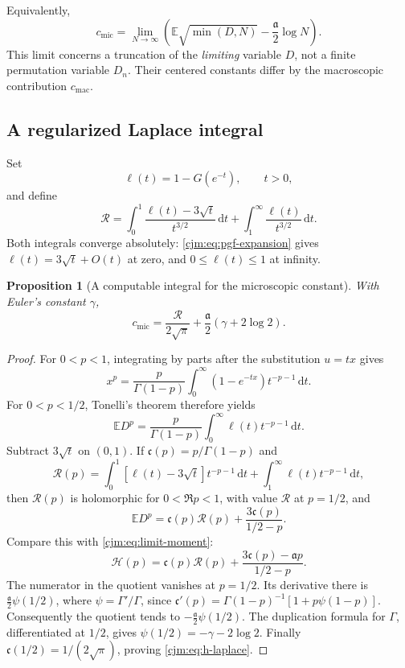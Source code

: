 \documentclass[11pt,a4paper]{article}
\newtheorem{proposition}[proposition]{Proposition}
\theoremstyle{definition}\newaliascnt{definition}{theorem}
\theoremstyle{remark}\newaliascnt{remark}{theorem}
\newcommand{\dd}{\mathrm d}
\newcommand{\ljE}{\mathbb E}
\newcommand{\cjmic}{c_{\mathrm{mic}}}
\newcommand{\cjmac}{c_{\mathrm{mac}}}
\begin{document}
Equivalently,
\begin{equation}
 \cjmic=\lim_{N\to\infty}
 \left(\ljE\sqrt{\min(D,N)}-\frac{\mathfrak a}2\log N\right).
 \label{cjm:eq:h-capped}
\end{equation}
This limit concerns a truncation of the \emph{limiting} variable $D$,
not a finite permutation variable $D_n$. Their centered constants differ
by the macroscopic contribution $\cjmac$.

\subsection{A regularized Laplace integral}
Set
\[
 \ell(t)=1-G(e^{-t}),\qquad t>0,
\]
and define
\begin{equation}
 \mathcal R=\int_0^1\frac{\ell(t)-3\sqrt t}{t^{3/2}}\,\dd t
                 +\int_1^\infty\frac{\ell(t)}{t^{3/2}}\,\dd t.
 \label{cjm:eq:A-integral}
\end{equation}
Both integrals converge absolutely: \eqref{cjm:eq:pgf-expansion} gives
$\ell(t)=3\sqrt t+O(t)$ at zero, and $0\le\ell(t)\le1$ at infinity.

\begin{proposition}[A computable integral for the microscopic constant]
\label{cjm:prop:h-laplace}
With Euler's constant $\gamma$,
\begin{equation}
 \cjmic=\frac{\mathcal R}{2\sqrt\pi}
                  +\frac{\mathfrak a}2(\gamma+2\log2).
 \label{cjm:eq:h-laplace}
\end{equation}
\end{proposition}
\begin{proof}
For $0<p<1$, integrating by parts after the substitution $u=tx$ gives
\[
 x^p=\frac{p}{\Gamma(1-p)}
       \int_0^\infty(1-e^{-tx})t^{-p-1}\,\dd t.
\]
For $0<p<1/2$, Tonelli's theorem therefore yields
\begin{equation}
 \ljE D^p=\frac{p}{\Gamma(1-p)}
             \int_0^\infty\ell(t)t^{-p-1}\,\dd t.
 \label{cjm:eq:fractional-moment}
\end{equation}
Subtract $3\sqrt t$ on $(0,1)$. If $\mathfrak c(p)=p/\Gamma(1-p)$ and
\[
 \mathcal R(p)=\int_0^1[\ell(t)-3\sqrt t]t^{-p-1}\,\dd t
                 +\int_1^\infty\ell(t)t^{-p-1}\,\dd t,
\]
then $\mathcal R(p)$ is holomorphic for $0<\Re p<1$, with value
$\mathcal R$ at $p=1/2$, and
\[
 \ljE D^p=\mathfrak c(p)\mathcal R(p)+\frac{3\mathfrak c(p)}{1/2-p}.
\]
Compare this with \eqref{cjm:eq:limit-moment}:
\[
 \mathcal H(p)=\mathfrak c(p)\mathcal R(p)+\frac{3\mathfrak c(p)-\mathfrak ap}{1/2-p}.
\]
The numerator in the quotient vanishes at $p=1/2$. Its derivative there is
$\frac{\mathfrak a}2\psi(1/2)$, where $\psi=\Gamma'/\Gamma$, since
$\mathfrak c'(p)=\Gamma(1-p)^{-1}[1+p\psi(1-p)]$.
Consequently the quotient tends to $-\frac{\mathfrak a}2\psi(1/2)$.
The duplication formula for $\Gamma$, differentiated at $1/2$, gives
$\psi(1/2)=-\gamma-2\log2$. Finally
$\mathfrak c(1/2)=1/(2\sqrt\pi)$, proving \eqref{cjm:eq:h-laplace}.
\end{proof}
\end{document}
